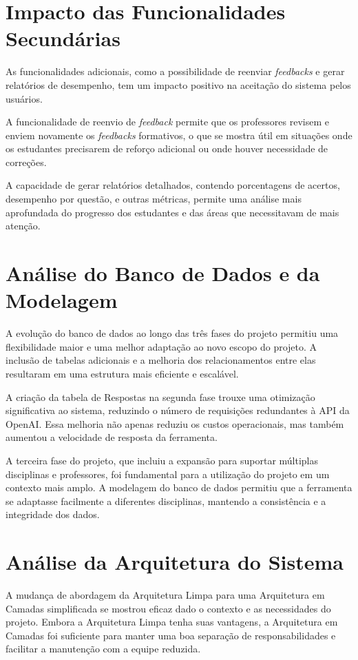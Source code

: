 \section{Impacto das Funcionalidades Secundárias}

As funcionalidades adicionais, como a possibilidade de reenviar \textit{feedbacks} e gerar relatórios de desempenho, tem um impacto positivo na aceitação do sistema pelos usuários. 

A funcionalidade de reenvio de \textit{feedback} permite que os professores revisem e enviem novamente os \textit{feedbacks} formativos, o que se mostra útil em situações onde os estudantes precisarem de reforço adicional ou onde houver necessidade de correções.

A capacidade de gerar relatórios detalhados, contendo porcentagens de acertos, desempenho por questão, e outras métricas, permite uma análise mais aprofundada do progresso dos estudantes e das áreas que necessitavam de mais atenção.

\section{Análise do Banco de Dados e da Modelagem}

A evolução do banco de dados ao longo das três fases do projeto permitiu uma flexibilidade maior e uma melhor adaptação ao novo escopo do projeto. A inclusão de tabelas adicionais e a melhoria dos relacionamentos entre elas resultaram em uma estrutura mais eficiente e escalável.

A criação da tabela de Respostas na segunda fase trouxe uma otimização significativa ao sistema, reduzindo o número de requisições redundantes à API da OpenAI. Essa melhoria não apenas reduziu os custos operacionais, mas também aumentou a velocidade de resposta da ferramenta.

A terceira fase do projeto, que incluiu a expansão para suportar múltiplas disciplinas e professores, foi fundamental para a utilização do projeto em um contexto mais amplo. A modelagem do banco de dados permitiu que a ferramenta se adaptasse facilmente a diferentes disciplinas, mantendo a consistência e a integridade dos dados.

\section{Análise da Arquitetura do Sistema}

A mudança de abordagem da Arquitetura Limpa para uma Arquitetura em Camadas simplificada se mostrou eficaz dado o contexto e as necessidades do projeto. Embora a Arquitetura Limpa tenha suas vantagens, a Arquitetura em Camadas foi suficiente para manter uma boa separação de responsabilidades e facilitar a manutenção com a equipe reduzida.

